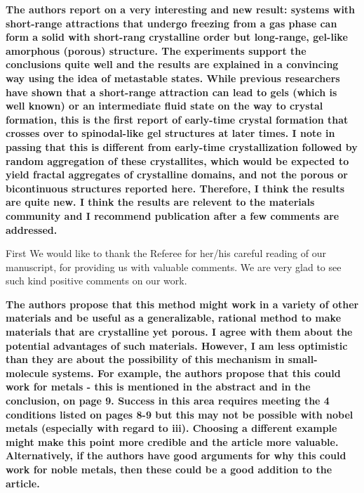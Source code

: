 \documentclass[11pt]{article}
\begin{document}
{\bf
The authors report on a very interesting and new result: systems with short-range attractions that undergo freezing from a gas phase can form a solid with short-rang crystalline order but long-range, gel-like amorphous (porous) structure. The experiments support the conclusions quite well and the results are explained in a convincing way using the idea of metastable states. While previous researchers have shown that a short-range attraction can lead to gels (which is well known) or an intermediate fluid state on the way to crystal formation, this is the first report of early-time crystal formation that crosses over to spinodal-like gel structures at later times. I note in passing that this is different from early-time crystallization followed by random aggregation of these crystallites, which would be expected to yield fractal aggregates of crystalline domains, and not the porous or bicontinuous structures reported here. Therefore, I think the results are quite new. I think the results are relevent to the materials community and I recommend publication after a few comments are addressed.
}


\bigskip
\doublespacing

First We would like to thank the Referee for her/his careful reading of our manuscript, for providing us with valuable comments. We are very glad to see such kind positive comments on our work.


\vspace{1em}

\singlespacing

{\bf
The authors propose that this method might work in a variety of other materials and be useful as a generalizable, rational method to make materials that are crystalline yet porous. I agree with them about the potential advantages of such materials. However, I am less optimistic than they are about the possibility of this mechanism in small-molecule systems. For example, the authors propose that this could work for metals - this is mentioned in the abstract and in the conclusion, on page 9. Success in this area requires meeting the 4 conditions listed on pages 8-9 but this may not be possible with nobel metals (especially with regard to iii). Choosing a different example might make this point more credible and the article more valuable. Alternatively, if the authors have good arguments for why this could work for noble metals, then these could be a good addition to the article.
}



\bigskip
\doublespacing
\end{document}
